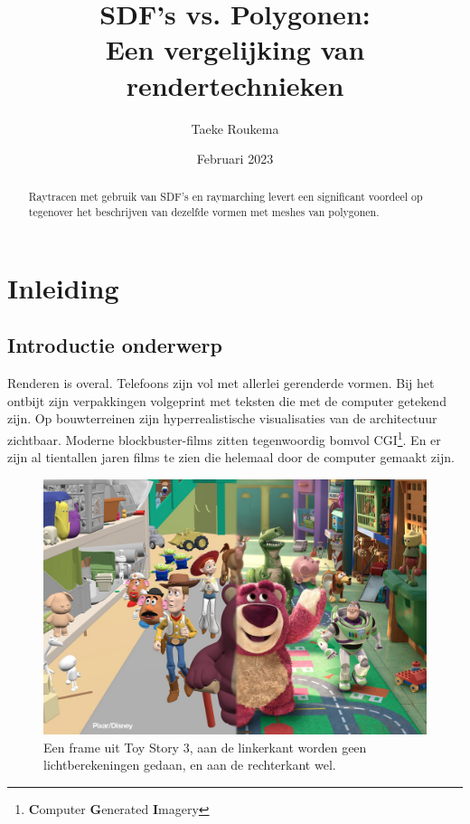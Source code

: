 \documentclass[12pt, a4paper]{article}
\title{\Huge SDF's vs. Polygonen:\\ \large Een vergelijking van rendertechnieken}
\author{Taeke Roukema}
\date{Februari 2023}
\begin{document}
\maketitle
\begin{abstract}
Raytracen met gebruik van SDF's en raymarching levert een significant voordeel op tegenover het beschrijven van dezelfde vormen met meshes van polygonen.
\end{abstract}
\clearpage
\tableofcontents{}
\clearpage
\section{Inleiding}
\subsection{Introductie onderwerp}

Renderen is overal. Telefoons zijn vol met allerlei gerenderde vormen. Bij het ontbijt zijn verpakkingen volgeprint met teksten die met de computer getekend zijn. Op bouwterreinen zijn hyperrealistische visualisaties van de architectuur zichtbaar. Moderne blockbuster-films zitten tegenwoordig bomvol CGI\footnote{\textbf{C}omputer \textbf{G}enerated \textbf{I}magery}. En er zijn al tientallen jaren films te zien die helemaal door de computer gemaakt zijn. 

\begin{figure}
    \includegraphics[width=1\linewidth]{toystory3comparison.jpg}
    \caption{Een frame uit Toy Story 3, aan de linkerkant worden geen lichtberekeningen gedaan, en aan de rechterkant wel.}
    \label{fig:toystory3}
\end{figure}
\end{document}
